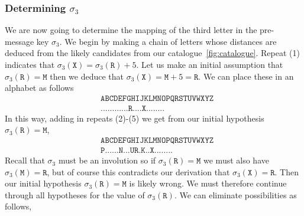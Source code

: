 \subsubsection{Determining $\sigma_3$}
We are now going to determine the mapping of the third letter in
the pre-message key $\sigma_3$. We begin by making a chain of
letters whose distances are deduced from the likely candidates from
our catalogue~\ref{fig:catalogue}. Repeat (1) indicates that
$\sigma_3(\texttt{X}) = \sigma_3(\texttt{R}) + 5$. Let us make an
initial assumption that $\sigma_3(\texttt{R}) = \texttt{M}$ then we
deduce that $\sigma_3(\texttt{X}) = \texttt{M} + 5 = \texttt{R}$.
We can place these in an alphabet as follows
\begin{align*}
  & \texttt{ABCDEFGHIJKLMNOPQRSTUVWXYZ} \\
  & \texttt{............R....X........}
\end{align*}
In this way, adding in repeats (2)-(5) we get from our initial
hypothesis $\sigma_3(\texttt{R}) = \texttt{M}$,
\begin{align*}
  & \texttt{ABCDEFGHIJKLMNOPQRSTUVWXYZ} \\
  & \texttt{P......N...UR.K..X........}
\end{align*}
Recall that $\sigma_3$ must be an involution so if
$\sigma_3(\texttt{R}) = \texttt{M}$ we must also have
$\sigma_3(\texttt{M}) = \texttt{R}$, but of course this contradicts
our derivation that $\sigma_3(\texttt{X}) = \texttt{R}$. Then our
initial hypothesis $\sigma_3(\texttt{R}) = \texttt{M}$ is likely
wrong. We must therefore continue through all hypotheses for the
value of $\sigma_3(\texttt{R})$. We can eliminate possibilities as follows,
